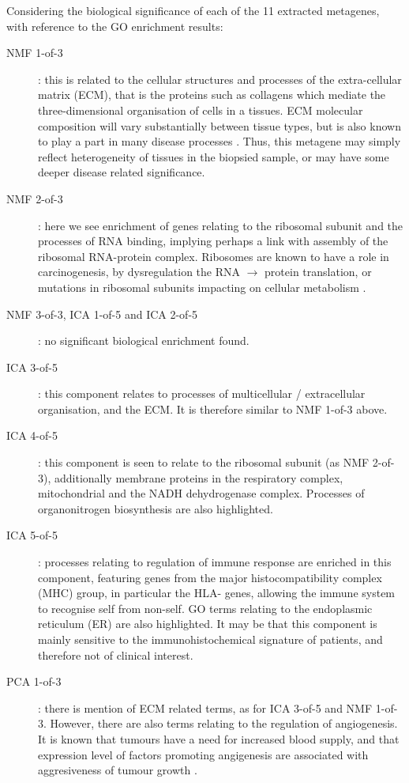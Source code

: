 \documentclass[draft,tikz, 12pt,a4paper,oneside,fleqn]{article}
\begin{document}
Considering the biological significance of each of the 11 extracted metagenes, with reference to the GO enrichment results:
\begin{description}
%
\item[NMF 1-of-3]: this is related to the cellular structures and processes of the extra-cellular matrix (ECM), that is the proteins such as collagens which mediate the three-dimensional organisation of cells in a tissues.  ECM molecular composition will vary substantially between tissue types, but is also known to play a part in many disease processes \cite{Theocharis2019}.  Thus, this metagene may simply reflect heterogeneity of tissues in the biopsied sample, or may have some deeper disease related significance.
%
\item[NMF 2-of-3]: here we see enrichment of genes relating to the ribosomal subunit and the processes of RNA binding, implying perhaps a link with assembly of the ribosomal RNA-protein complex.   Ribosomes are known to have a role in carcinogenesis, by dysregulation the RNA $\rightarrow$ protein translation, or mutations in ribosomal subunits impacting on cellular metabolism \cite{Sulima2017}.
%
\item[NMF 3-of-3, ICA 1-of-5 and ICA 2-of-5]: no significant biological enrichment found.
%
\item[ICA 3-of-5]: this component relates to processes of multicellular / extracellular organisation, and the ECM.  It is therefore similar to NMF 1-of-3 above.
\item[ICA 4-of-5]: this component is seen to relate to the ribosomal subunit (as NMF 2-of-3), additionally membrane proteins in the respiratory complex, mitochondrial and the NADH dehydrogenase complex.  Processes of organonitrogen biosynthesis are also highlighted. 
%
\item[ICA 5-of-5]: processes relating to regulation of immune response are enriched in this component, featuring genes from the major histocompatibility complex (MHC) group, in particular the HLA- genes, allowing the immune system to recognise self from non-self.  GO terms relating to the endoplasmic reticulum (ER) are also highlighted.  It may be that this component is mainly sensitive to the immunohistochemical signature of patients, and therefore not of clinical interest.
%
\item[PCA 1-of-3]: there is mention of ECM related terms, as for ICA 3-of-5 and NMF 1-of-3.   However, there are also terms relating to the regulation of angiogenesis.  It is known that tumours have a need for increased blood supply, and that expression level of factors promoting angigenesis are associated with aggresiveness of tumour growth \cite{Nishida2006}.  

\end{description}
\end{document}
